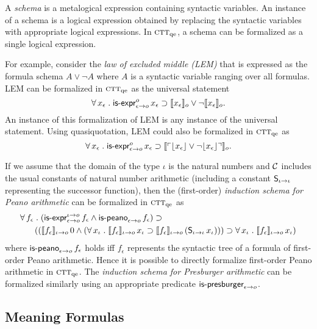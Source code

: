 \documentclass[fleqn]{llncs}
\newcommand{\sC}{\mbox{$\cal C$}}
\newcommand{\churchqe}{$\mbox{\sc ctt}_{\rm qe}$}
\newcommand{\sembrack}[1]{\llbracket#1\rrbracket}
\newcommand{\synbrack}[1]{\ulcorner#1\urcorner}
\newcommand{\commabrack}[1]{\lfloor#1\rfloor}
\newcommand{\mname}[1]{\mbox{\sf #1}}
\newcommand{\mdot}{\mathrel.}
\newcommand{\tarrow}{\rightarrow}
\newcommand{\Neg}{\neg}
\newcommand{\Andd}{\wedge}
\newcommand{\Implies}{\supset}
\newcommand{\Or}{\vee}
\newcommand{\ForallApp}{\forall\,}
\begin{document}
A \emph{schema} is a metalogical expression containing syntactic
variables.  An instance of a schema is a logical expression obtained
by replacing the syntactic variables with appropriate logical
expressions.  In {\churchqe}, a schema can be formalized as a single
logical expression.

For example, consider the \emph{law of excluded middle (LEM)} that is
expressed as the formula schema $A \Or \Neg A$ where $A$ is a
syntactic variable ranging over all formulas.  LEM can be
formalized in {\churchqe} as the universal statement
\[\ForallApp x_\epsilon \mdot 
\mname{is-expr}_{\epsilon \tarrow o}^{o} \, x_\epsilon \Implies
\sembrack{x_\epsilon}_o \Or \Neg \sembrack{x_\epsilon}_o.\] An
instance of this formalization of LEM is any instance of the universal
statement.  Using quasiquotation, LEM could also be formalized in
{\churchqe} as
\[\ForallApp x_\epsilon \mdot 
\mname{is-expr}_{\epsilon \tarrow o}^{o} \, x_\epsilon \Implies
\sembrack{\synbrack{\commabrack{x_\epsilon} \Or \Neg
    \commabrack{x_\epsilon}}}_o.\]

If we assume that the domain of the type $\iota$ is the natural
numbers and $\sC$ includes the usual constants of natural number
arithmetic (including a constant $\mname{S}_{\iota \tarrow \iota}$
representing the successor function), then the (first-order)
\emph{induction schema for Peano arithmetic} can be formalized in
     {\churchqe} as
\begin{align*}
&
\ForallApp f_\epsilon \mdot 
(\mname{is-expr}_{\epsilon \tarrow o}^{\iota \tarrow o} \, f_\epsilon \Andd
\mname{is-peano}_{\epsilon \tarrow o} \, f_\epsilon) \Implies {} \\
&
\hspace{4ex}
((\sembrack{f_\epsilon}_{\iota \tarrow o} \, 0 \Andd
(\ForallApp x_\iota \mdot \sembrack{f_\epsilon}_{\iota \tarrow o} \, x_\iota \Implies
\sembrack{f_\epsilon}_{\iota \tarrow o} \, 
(\mname{S}_{\iota \tarrow \iota} \, x_\iota)))
\Implies 
\ForallApp x_\iota \mdot \sembrack{f_\epsilon}_{\iota \tarrow o} \, x_\iota)
\end{align*}
where $\mname{is-peano}_{\epsilon \tarrow o} \, f_\epsilon$ holds iff
$f_\epsilon$ represents the syntactic tree of a formula of first-order
Peano arithmetic.  Hence it is possible to directly formalize
first-order Peano arithmetic in {\churchqe}.  The \emph{induction
  schema for Presburger arithmetic} can be formalized similarly using
an appropriate predicate $\mname{is-presburger}_{\epsilon \tarrow o}$.

\subsection{Meaning Formulas} \label{secsub:meaning-formulas}
\end{document}
